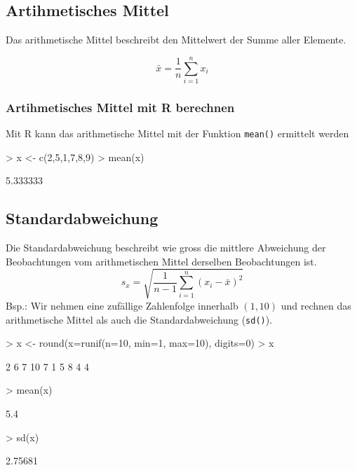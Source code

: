 \subsection{Artihmetisches Mittel}
Das arithmetische Mittel beschreibt den Mittelwert der Summe aller Elemente.

\[ \bar{x} = \frac{1}{n} \sum\limits_{i=1}^{n} x_i \]

\subsubsection{Artihmetisches Mittel mit R berechnen}
Mit R kann das arithmetische Mittel mit der Funktion \verb!mean()! 
ermittelt werden
\begin{Schunk}
\begin{Sinput}
> x <- c(2,5,1,7,8,9)
> mean(x)
\end{Sinput}
\begin{Soutput}
[1] 5.333333
\end{Soutput}
\end{Schunk}

\subsection{Standardabweichung}
Die Standardabweichung beschreibt wie gross die mittlere Abweichung der
Beobachtungen vom arithmetischen Mittel derselben Beobachtungen ist.
\[ s_x = \sqrt{ \frac{1}{n-1} \sum\limits_{i=1}^{n} (x_i - \bar{x})^2 } \]
Bsp.: Wir nehmen eine zufällige Zahlenfolge innerhalb $(1,10)$ und
rechnen das arithmetische Mittel als auch die Standardabweichung (\verb!sd()!).
\begin{Schunk}
\begin{Sinput}
> x <- round(x=runif(n=10, min=1, max=10), digits=0)
> x
\end{Sinput}
\begin{Soutput}
 [1]  2  6  7 10  7  1  5  8  4  4
\end{Soutput}
\begin{Sinput}
> mean(x)
\end{Sinput}
\begin{Soutput}
[1] 5.4
\end{Soutput}
\begin{Sinput}
> sd(x)
\end{Sinput}
\begin{Soutput}
[1] 2.75681
\end{Soutput}
\end{Schunk}

